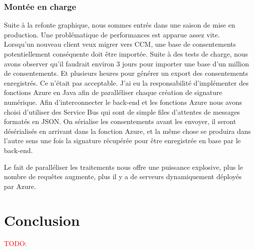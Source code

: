 \documentclass[12pt, a4paper]{report}
\makeatletter
\newcommand\tab[1][1cm]{\hspace*{#1}}
\newcommand\TODO[1]{\textcolor{red}{TODO\@: #1}}
\makeatother
\begin{document}
            \subsection{Montée en charge}
                \tab{} Suite à la refonte graphique, nous sommes entrés dans une saison de mise en production.\newline
                Une problématique de performances est apparue assez vite. Lorsqu'un nouveau client veux migrer vers CCM, une base de consentements potentiellement conséquente doit être importée. \newline
                Suite à des tests de charge, nous avons observer qu'il faudrait environ 3 jours pour importer une base d'un million de consentements. Et plusieurs heures pour générer un export des consentements enregistrés. Ce n'était pas acceptable.\newline
                J'ai eu la responsabilité d'implémenter des fonctions Azure en Java afin de paralléliser chaque création de signature numérique.
                Afin d'interconnecter le back-end et les fonctions Azure nous avons choisi d'utiliser des Service Bus qui sont de simple files d'attentes de messages formatés en JSON.\newline
                On sérialise les consentements avant les envoyer, il seront désérialisés en arrivant dans la fonction Azure, et la même chose se produira dans l'autre sens une fois la signature récupérée pour être enregistrée en base par le back-end.\newline

                Le fait de paralléliser les traitements nous offre une puissance explosive, plus le nombre de requêtes augmente, plus il y a de serveurs dynamiquement déployés par Azure.\newline
    \chapter{Conclusion}
        \TODO{}
	\makeutbmbackcover{}
\end{document}
